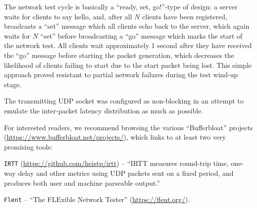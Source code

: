 The network test cycle is basically a ``ready, set, go!''-type of design: a
server waits for clients to say hello, and, after all $N$ clients have been
registered, broadcasts a ``set'' message which all clients echo back to the
server, which again waits for $N$ ``set'' before broadcasting a ``go''
message which marks the start of the network test. All clients wait
approximately 1 second after they have received the ``go'' message before
starting the packet generation, which decreases the likelihood of clients
failing to start due to the start packet being lost. This simple approach
proved resistant to partial network failures during the test wind-up stage.

The transmitting UDP socket was configured as non-blocking in an attempt to
emulate the inter-packet latency distribution as much as possible.

For interested readers, we recommend browsing the various
``Bufferbloat'' projects (\url{https://www.bufferbloat.net/projects/}), which
links to at least two very promising tools:

\texttt{IRTT} (\url{https://github.com/heistp/irtt}) -- ``IRTT measures round-trip time,
one-way delay and other metrics using UDP packets sent on a fixed period, and
produces both user and machine parseable output.''

\texttt{Flent} -- ``The FLExible Network Tester'' (\url{https://flent.org/}).
